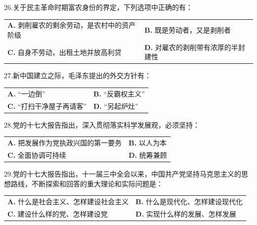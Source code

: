 \documentclass[UTF8,11pt]{ctexart}
\begin{document}
26.关于民主革命时期富农身份的界定，下列选项中正确的有：


\begin{center}\begin{tabular}{>{\raggedright\arraybackslash}p{\dimexpr(\linewidth-4\tabcolsep)/2\relax}>{\raggedright\arraybackslash}p{\dimexpr(\linewidth-4\tabcolsep)/2\relax}}
\textbf{A.} 剥削雇农的剩余劳动，是农村中的资产阶级 & \textbf{B.} 既是劳动者，又是剥削者\\[.35em]
\textbf{C.} 自身不劳动，出租土地并放高利贷 & \textbf{D.} 对雇农的剥削带有浓厚的半封建性\\[.35em]\end{tabular}\end{center}

27.新中国建立之际，毛泽东提出的外交方针有：


\begin{center}\begin{tabular}{>{\raggedright\arraybackslash}p{\dimexpr(\linewidth-4\tabcolsep)/2\relax}>{\raggedright\arraybackslash}p{\dimexpr(\linewidth-4\tabcolsep)/2\relax}}
\textbf{A.} “一边倒” & \textbf{B.} “反霸权主义”\\[.35em]
\textbf{C.} “打扫干净屋子再请客” & \textbf{D.} “另起炉灶”\\[.35em]\end{tabular}\end{center}

28.党的十七大报告指出，深入贯彻落实科学发展观，必须坚持：


\begin{center}\begin{tabular}{>{\raggedright\arraybackslash}p{\dimexpr(\linewidth-4\tabcolsep)/2\relax}>{\raggedright\arraybackslash}p{\dimexpr(\linewidth-4\tabcolsep)/2\relax}}
\textbf{A.} 把发展作为党执政兴国的第一要务 & \textbf{B.} 以人为本\\[.35em]
\textbf{C.} 全面协调可持续 & \textbf{D.} 统筹兼顾\\[.35em]\end{tabular}\end{center}

29.党的十七大报告指出，十一届三中全会以来，中国共产党坚持马克思主义的思想路线，不断探索和回答的重大理论和实际问题是：


\begin{center}\begin{tabular}{>{\raggedright\arraybackslash}p{\dimexpr(\linewidth-4\tabcolsep)/2\relax}>{\raggedright\arraybackslash}p{\dimexpr(\linewidth-4\tabcolsep)/2\relax}}
\textbf{A.} 什么是社会主义、怎样建设社会主义 & \textbf{B.} 什么是现代化、怎样建设现代化\\[.35em]
\textbf{C.} 建设什么样的党、怎样建设党 & \textbf{D.} 实现什么样的发展、怎样发展\\[.35em]\end{tabular}\end{center}
\end{document}
